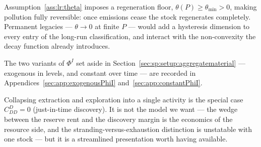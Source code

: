  Assumption~\ref{ass:lr:theta} imposes a regeneration floor,
$\theta\left(P\right)\ge\theta_{\min}>0$, making pollution fully reversible: once emissions cease the
stock regenerates completely. Permanent legacies --- $\theta\to0$ at finite $P$ --- would add a
hysteresis dimension to every entry of the long-run classification, and interact with the
non-convexity the decay function already introduces.

 The two variants of $\Phi^I$ set aside in
Section~\ref{sec:sp:setup:aggregatematerial} --- exogenous in levels, and constant over time --- are
recorded in Appendices~\ref{sec:app:exogenousPhiI} and~\ref{sec:app:constantPhiI}.

 Collapsing extraction and exploration into a single activity is the
special case $C^D_{DD}=0$ (just-in-time discovery). It is not the model we want --- the wedge between
the reserve rent and the discovery margin is the economics of the resource side, and the
stranding-versus-exhaustion distinction is unstatable with one stock --- but it is a streamlined
presentation worth having available.
